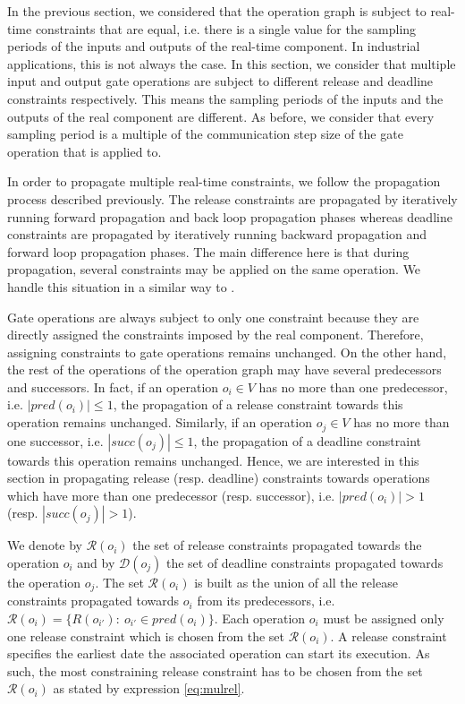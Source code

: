 In the previous section, we considered that the operation graph is subject to real-time constraints that are equal, i.e. there is a single value for the sampling periods of the inputs and outputs of the real-time component. In industrial applications, this is not always the case. In this section, we consider that multiple input and output gate operations are subject to different release and deadline constraints respectively. This means the sampling periods of the inputs and the outputs of the real component are different. As before, we consider that every sampling period is a multiple of the communication step size of the gate operation that is applied to.

In order to propagate multiple real-time constraints, we follow the propagation process described previously. The release constraints are propagated by iteratively running forward propagation and back loop propagation phases whereas deadline constraints are propagated by iteratively running backward propagation and forward loop propagation phases. The main difference here is that during propagation, several constraints may be applied on the same operation. We handle this situation in a similar way to \cite{faure:2011}.

Gate operations are always subject to only one constraint because they are directly assigned the constraints imposed by the real component. Therefore, assigning constraints to gate operations remains unchanged. On the other hand, the rest of the operations of the operation graph may have several predecessors and successors. In fact, if an operation $o_i \in V$ has no more than one predecessor, i.e. $|pred(o_i)| \leq 1$, the propagation of a release constraint towards this operation remains unchanged. Similarly, if an operation $o_j \in V$ has no more than one successor, i.e. $|succ(o_j)| \leq 1$, the propagation of a deadline constraint towards this operation remains unchanged. Hence, we are interested in this section in propagating release (resp. deadline) constraints towards operations which have more than one predecessor (resp. successor), i.e. $|pred(o_i)| > 1$ (resp. $|succ(o_j)| > 1$). 

We denote by $\mathcal{R}(o_i)$ the set of release constraints propagated towards the operation $o_i$ and by $\mathcal{D}(o_j)$ the set of deadline constraints propagated towards the operation $o_j$. The set $\mathcal{R}(o_i)$ is built as the union of all the release constraints propagated towards $o_i$ from its predecessors, i.e. $\mathcal{R}(o_i) = \{R(o_{i'}):\ o_{i'} \in pred(o_i)\}$. Each operation $o_i$ must be assigned only one release constraint which is chosen from the set $\mathcal{R}(o_i)$. A release constraint specifies the earliest date the associated operation can start its execution. As such, the most constraining release constraint has to be chosen from the set $\mathcal{R}(o_i)$ as stated by expression \ref{eq:mulrel}.

